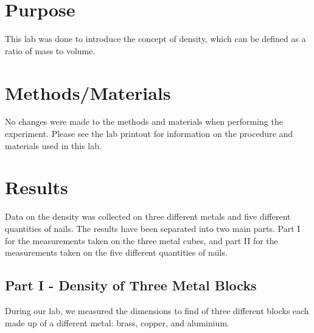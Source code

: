\documentclass{article}
\begin{document}

\tableofcontents
\newpage

\section{Purpose}

This lab was done to introduce the concept of density, which can be defined as a ratio of mass to volume.

\section{Methods/Materials}

No changes were made to the methods and materials when performing the experiment. Please see the lab printout for information on the procedure and materials used in this lab.

\section{Results}

Data on the density was collected on three different metals and five different quantities of nails. The results have been separated into two main parts. Part I for the measurements taken on the three metal cubes, and part II for the measurements taken on the five different quantities of nails.

	\subsection{Part I - Density of Three Metal Blocks}
	
	During our lab, we measured the dimensions to find  of three different blocks each made up of a different metal: brass, copper, and aluminium. 
\end{document}
